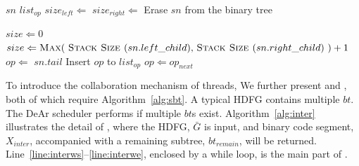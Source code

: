\begin{algorithm}[!ht]
    \caption{}
    \begin{algorithmic}[1]
        \Require    $sn$
        \Ensure     $list_{op}$
                \label{line:sbts}
        \State $size_{left} \Leftarrow$ 
        \State $size_{right} \Leftarrow$ 
        \State {}
        \Else
        \State {}
        \EndIf
        \EndIf
        \State {}   
        \State Erase $sn$ from the binary tree
        \State {}
        \EndIf

        \label{line:sbte}
        \Statex
          \label{line:gsss}
        \State $size \Leftarrow 0$
        \Else
        \State $size \Leftarrow \text{\textproc{Max}(\ \textproc{Stack Size }($sn.left\_child$), \textproc{Stack Size }($sn.right\_child$)\ )} + 1$
        \EndIf
        \State {}
        \EndFunction                    \label{line:gsse}
        \Statex
          \label{line:ssns}
        \State   $op \Leftarrow$ $sn.tail$
        \Do   
        \State Insert $op$ to $list_{op}$
        \State $op \Leftarrow op_{next}$
        \EndFunction                            \label{line:ssne}

    \end{algorithmic}
    \label{alg:sbt}
\end{algorithm}
\indent
To introduce the collaboration mechanism of threads, We further present  and , 
both of which require Algorithm~\ref{alg:sbt}.
A typical HDFG contains multiple $bt$.
The DeAr scheduler performs  if multiple $bt$s exist.
Algorithm~\ref{alg:inter} illustrates the detail of , 
where the HDFG, $\bar{G}$ is input, and binary code segment, 
$X_{inter}$, accompanied with a remaining subtree, $bt_{remain}$, will be returned.
\\\indent
Line~\ref{line:interws}--\ref{line:interwe}, enclosed by a while loop, is the main part of .
